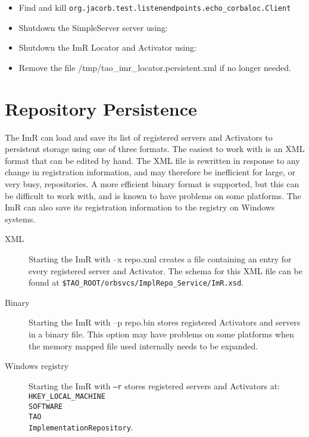 \begin{itemize}
    \item Find and kill {\tt org.jacorb.test.listenendpoints.echo\_corbaloc.Client}
    \item Shutdown the SimpleServer server using:


    \item Shutdown the ImR Locator and Activator using:


    \item Remove the file /tmp/tao\_imr\_locator.persistent.xml if no longer needed.
\end{itemize}

\section{Repository Persistence}

The ImR can load and save its list of registered servers and Activators to
persistent storage using one of three formats. The easiest to work with is
an XML format that can be edited by hand. The XML file is rewritten in
response to any change in registration information, and may therefore be
inefficient for large, or very busy, repositories. A more efficient binary
format is supported, but this can be difficult to work with, and is known
to have problems on some platforms. The ImR can also save its registration
information to the registry on Windows systems.

\begin{description}
    \item [XML] Starting the ImR with –x repo.xml creates a file containing
              an entry for every registered server and Activator. The schema for
              this XML file can be found at
              {\tt \$TAO\_ROOT/orbsvcs/ImplRepo\_Service/ImR.xsd}.

    \item [Binary] Starting the ImR with –p repo.bin stores registered
              Activators  and servers in a binary file.   This option may have
              problems on some platforms when the memory mapped file
              used internally needs to be expanded.

    \item [Windows registry] Starting the ImR with {\tt –r} stores registered servers
               and Activators at:
               {\tt HKEY\_LOCAL\_MACHINE\\SOFTWARE\\TAO\\ImplementationRepository}.
 \end{description}

